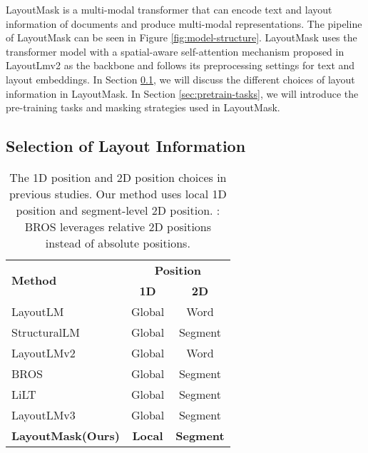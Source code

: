 \documentclass[11pt]{article}
\begin{document}
LayoutMask is a multi-modal transformer that can encode text and layout information of documents and produce multi-modal representations.
The pipeline of LayoutMask can be seen in Figure \ref{fig:model-structure}.
LayoutMask uses the transformer model with a spatial-aware self-attention mechanism proposed in LayoutLmv2 \citep{xu2021layoutlmv2} as the backbone and follows its preprocessing settings for text and layout embeddings.  
In Section \ref{sec:selection-layout}, we will discuss the different choices of layout information in LayoutMask.
In Section \ref{sec:pretrain-tasks}, we will introduce the pre-training tasks and masking strategies used in LayoutMask.

\subsection{Selection of Layout Information}
\label{sec:selection-layout}

\begin{table}[]
\footnotesize
\begin{tabular}{l|cc}
\hline
\multirow{2}{*}{\textbf{Method} } & \multicolumn{2}{c}{\textbf{Position}} \\ \cline{2-3}
     & \textbf{1D} & \textbf{2D} \\ \hline

LayoutLM  \citep{xu2020layoutlm}        & Global          & Word         \\

StructuralLM \citep{li2021structurallm}       & Global        & Segment       \\
LayoutLMv2  \citep{xu2021layoutlmv2}      & Global        & Word         \\
BROS   \citep{hong2022bros}        & Global          & Segment       \\
LiLT  \citep{wang2022lilt}         & Global        & Segment       \\
LayoutLMv3   \citep{huang2022layoutlmv3}      & Global        & Segment       \\ \hline
\textbf{LayoutMask(Ours)} & \textbf{Local}    & \textbf{Segment}   \\ \hline
\end{tabular}
\caption{\label{table:survey-of-positions}
The 1D position and 2D position choices in previous studies. Our method uses local 1D position and segment-level 2D position. : BROS leverages relative 2D positions instead of absolute positions.
}
\end{table}
\end{document}
